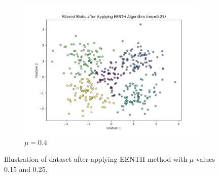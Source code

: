 \begin{figure}[htbp]
\begin{subfigure}[b]{0.3\textwidth}
		\includegraphics[width=\textwidth]{figures/eenth/filtered_blobs_mu_0.25}
		\caption{$\mu = 0.4$}
		\label{fig:mu0.4}
	\end{subfigure}
	\caption{Illustration of dataset after applying EENTH method with $\mu$ values 0.15 and 0.25.}
	\label{fig:mu_variation_1}
\end{figure}

